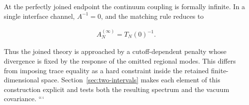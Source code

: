 At the perfectly joined endpoint the continuum coupling is formally infinite. In a single interface channel, $A^{-1}=0$, and the matching rule reduces to

\begin{align}
A_N^{(\infty)}=T_N(0)^{-1}.
\end{align}

Thus the joined theory is approached by a cutoff-dependent penalty whose divergence is fixed by the response of the omitted regional modes. This differs from imposing trace equality as a hard constraint inside the retained finite-dimensional space. Section~\ref{sec:two-intervals} makes each element of this construction explicit and tests both the resulting spectrum and the vacuum covariance.
```
